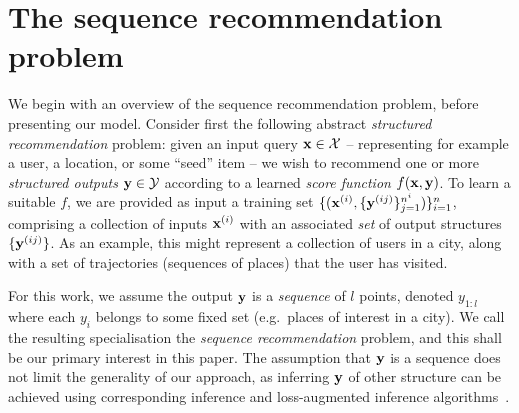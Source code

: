 \secmoveup
\section{The sequence recommendation problem}
\label{sec:recseq}
\textmoveup

We begin with an overview of the sequence recommendation problem, before presenting our model.
Consider first the following abstract
\emph{structured recommendation} problem:
given an input query $\mathbf{x} \in \mathcal{X}$ -- representing for example a user, a location, or some ``seed'' item --
we wish to recommend one or more \emph{structured outputs} $\mathbf{y} \in \mathcal{Y}$ according to a learned \emph{score function} $f(\mathbf{x},\mathbf{y})$.
To learn a suitable $f$,
we are provided as input a training set
$\{ ( \mathbf{x}^{({i})}, \{ \mathbf{y}^{({ij})} \}_{j=1}^{n^i} ) \}_{i=1}^{n}$,
comprising a collection of inputs $\mathbf{x}^{({i})}$ with an associated \emph{set} of output structures $\{ \mathbf{y}^{({ij})} \}$.
As an example, this might represent a collection of users in a city, along with a set of trajectories (sequences of places) that the user has visited.

For this work, we assume the output $\mathbf{y}$ is a \emph{sequence} of $l$ points, denoted $y_{1:l}$
where each $y_i$ belongs to some fixed set (e.g.\ places of interest in a city).
We call the resulting specialisation the \emph{sequence recommendation} problem,
and this shall be our primary interest in this paper.
The assumption that $\mathbf{y}$ is a sequence does not limit the generality of our approach,
as inferring $\mathbf{y}$ of other structure can be achieved using corresponding inference and loss-augmented inference algorithms~\cite{joachims2009predicting}.  %

